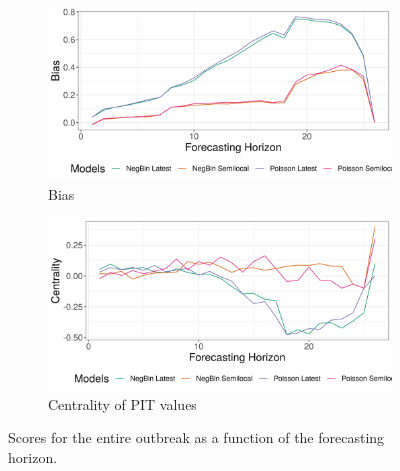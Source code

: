 \begin{figure}[H]
\begin{subfigure}{0.5\textwidth}
  \centering
  \includegraphics[width=\linewidth]{../output/Lolwa_bias.png}  
  \caption{Bias}
  \label{fig:sub-third}
\end{subfigure}
\begin{subfigure}{0.5\textwidth}
  \centering
  \includegraphics[width=\linewidth]{../output/Lolwa_centrality.png}  
  \caption{Centrality of PIT values}
  \label{fig:nat_scores_4}
\end{subfigure}
  \caption{Scores for the entire outbreak as a function of the forecasting horizon.}

  \label{fig:nat_scores}
\end{figure}
